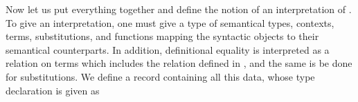 
Now let us put everything together and define the notion of an interpretation of \GTT.
To give an interpretation, one must give a type of semantical types, contexts, terms, substitutions, and functions mapping the syntactic objects to their semantical counterparts.
In addition, definitional equality is interpreted as a relation on terms which includes the relation  defined in , and the same is be done for substitutions.
We define a record containing all this data, whose type declaration is given as

\begin{code}%
\>[0]\AgdaSpace{}%
\AgdaSpace{}%
\AgdaSymbol{\{}\AgdaSpace{}%
\AgdaSymbol{\}}\AgdaSpace{}%
\AgdaSymbol{:}\AgdaSpace{}%
\AgdaSpace{}%
\AgdaSymbol{(}\AgdaSpace{}%
\AgdaSymbol{(}\AgdaSpace{}%
\AgdaSpace{}%
\AgdaSymbol{))}\AgdaSpace{}%
\<%
\end{code}

